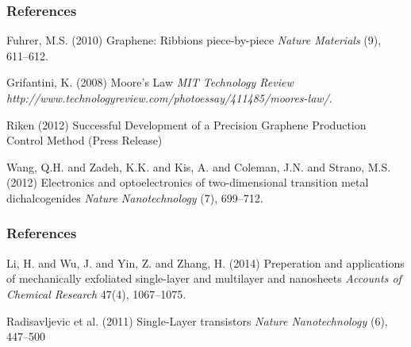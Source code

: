 \documentclass{beamer}
\begin{document}
\begin{frame}
\frametitle{References}
\footnotesize{
	\begin{thebibliography}{99}
	 Fuhrer, M.S. (2010)
	\newblock  Graphene: Ribbions piece-by-piece
	\newblock \emph{Nature Materials} (9), 611--612.

	 Grifantini, K. (2008)
	\newblock Moore's Law
	\newblock \emph{MIT Technology Review} \emph{http://www.technologyreview.com/photoessay/411485/moores-law/}.

	 Riken (2012)
	\newblock Successful Development of a Precision Graphene Production Control Method (Press Release)

	 Wang, Q.H. and Zadeh, K.K. and Kis, A. and Coleman, J.N. and Strano, M.S. (2012)
	\newblock Electronics and optoelectronics of two-dimensional transition metal dichalcogenides
	\newblock \emph{Nature Nanotechnology} (7), 699--712.

	\end{thebibliography}
}
\end{frame}

\begin{frame}
\frametitle{References}
\footnotesize{
	\begin{thebibliography}{99}
	 Li, H. and Wu, J. and Yin, Z. and Zhang, H. (2014)
	\newblock Preperation and applications of mechanically exfoliated single-layer and multilayer  and  nanosheets
	\newblock \emph{Accounts of Chemical Research} 47(4), 1067--1075.

	 Radisavljevic et al. (2011)
	\newblock Single-Layer  transistors
	\newblock \emph{Nature Nanotechnology} (6), 447--500
	
	\end{thebibliography}
}
\end{frame}

\end{document}
